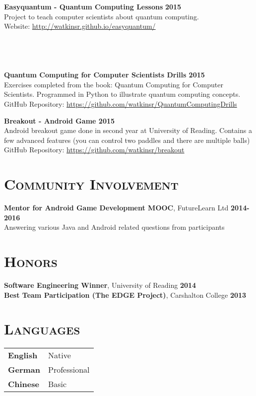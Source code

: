 \documentclass[line, margin, 10pt]{res}
\begin{document}
\begin{resume}
{\bf Easyquantum - Quantum Computing Lessons} {\bf \hfill 2015}\\
Project to teach computer scientists about quantum computing. \\
Website: \url{http://watkinsr.github.io/easyquantum/}
\\\\\\\\\\
{\bf Quantum Computing for Computer Scientists Drills {\bf \hfill 2015}} \\
Exercises completed from the book: Quantum Computing for Computer Scientists. Programmed in Python to illustrate quantum computing concepts.\\
GitHub Repository: \url{https://github.com/watkinsr/QuantumComputingDrills}

{\bf Breakout - Android Game {\bf \hfill 2015}} \\
Android breakout game done in second year at University of Reading. Contains a few advanced features (you can control two paddles and there are multiple balls)\\
GitHub Repository: \url{https://github.com/watkinsr/breakout}

\section{\textsc{Community Involvement}}

{\bf Mentor for Android Game Development MOOC}, FutureLearn Ltd {\bf \hfill 2014-2016}\\
Answering various Java and Android related questions from participants

\section{\textsc{Honors}}

{\bf Software Engineering Winner}, University of Reading {\bf \hfill 2014}\\
{\bf Best Team Participation (The EDGE Project)}, Carshalton College {\bf \hfill 2013}

\section{\textsc{Languages}}
\begin{tabular}[t]{@{} p{1.2in} p{3.75in} @{}}

\textbf{English} & Native\\ 
\textbf{German} & Professional\\ \textbf{Chinese} & Basic

\end{tabular}

\end{resume}
\end{document}
